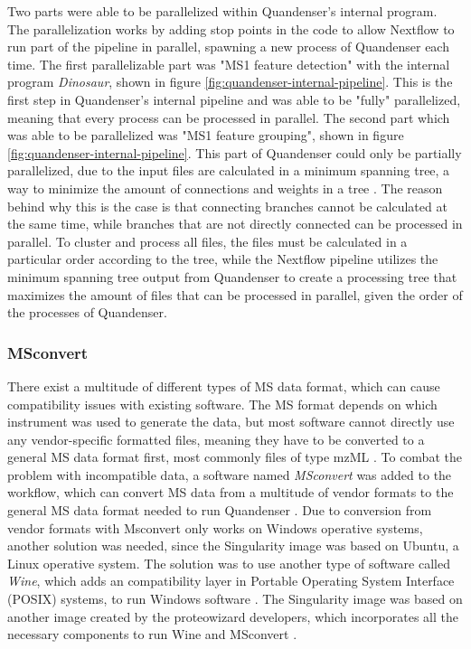 Two parts were able to be parallelized within Quandenser's internal program. The parallelization works by adding stop points in the code to allow Nextflow to run part of the pipeline in parallel, spawning a new process of Quandenser each time. The first parallelizable part was "MS1 feature detection" with the internal program \textit{Dinosaur}, shown in figure \ref{fig:quandenser-internal-pipeline}. This is the first step in Quandenser's internal pipeline and was able to be "fully" parallelized, meaning that every process can be processed in parallel. The second part which was able to be parallelized was "MS1 feature grouping", shown in figure \ref{fig:quandenser-internal-pipeline}. This part of Quandenser could only be partially parallelized, due to the input files are calculated in a minimum spanning tree, a way to minimize the amount of connections and weights in a tree \cite{min-span-tree}. The reason behind why this is the case is that connecting branches cannot be calculated at the same time, while branches that are not directly connected can be processed in parallel. To cluster and process all files, the files must be calculated in a particular order according to the tree, while the Nextflow pipeline utilizes the minimum spanning tree output from Quandenser to create a processing tree that maximizes the amount of files that can be processed in parallel, given the order of the processes of Quandenser.

\subsubsection{MSconvert}
There exist a multitude of different types of MS data format, which can cause compatibility issues with existing software. The MS format depends on which instrument was used to generate the data, but most software cannot directly use any vendor-specific formatted files, meaning they have to be converted to a general MS data format first, most commonly files of type mzML \cite{mzml-format}. To combat the problem with incompatible data, a software named \textit{MSconvert} was added to the workflow, which can convert MS data from a multitude of vendor formats to the general MS data format needed to run Quandenser \cite{proteowizard}. Due to conversion from vendor formats with Msconvert only works on Windows operative systems, another solution was needed, since the Singularity image was based on Ubuntu, a Linux operative system. The solution was to use another type of software called \textit{Wine}, which adds an compatibility layer in Portable Operating System Interface (POSIX) systems, to run Windows software \cite{wine}. The Singularity image was based on another image created by the proteowizard developers, which incorporates all the necessary components to run Wine and MSconvert \cite{docker-image} \cite{docker-howto}.

